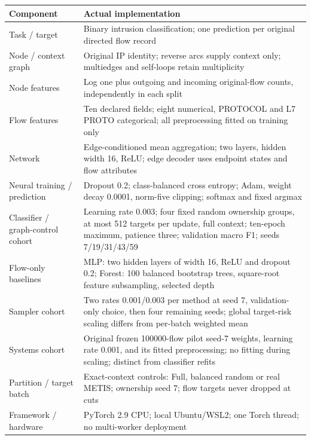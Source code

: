 \begin{tabular}{p{}p{}}
\toprule
Component & Actual implementation \\
\midrule
Task / target & Binary intrusion classification; one prediction per original directed flow record \\
Node / context graph & Original IP identity; reverse arcs supply context only; multiedges and self-loops retain multiplicity \\
Node features & Log one plus outgoing and incoming original-flow counts, independently in each split \\
Flow features & Ten declared fields; eight numerical, PROTOCOL and L7 PROTO categorical; all preprocessing fitted on training only \\
Network & Edge-conditioned mean aggregation; two layers, hidden width 16, ReLU; edge decoder uses endpoint states and flow attributes \\
Neural training / prediction & Dropout 0.2; class-balanced cross entropy; Adam, weight decay 0.0001, norm-five clipping; softmax and fixed argmax \\
Classifier / graph-control cohort & Learning rate 0.003; four fixed random ownership groups, at most 512 targets per update, full context; ten-epoch maximum, patience three; validation macro F1; seeds 7/19/31/43/59 \\
Flow-only baselines & MLP: two hidden layers of width 16, ReLU and dropout 0.2; Forest: 100 balanced bootstrap trees, square-root feature subsampling, selected depth \\
Sampler cohort & Two rates 0.001/0.003 per method at seed 7, validation-only choice, then four remaining seeds; global target-risk scaling differs from per-batch weighted mean \\
Systems cohort & Original frozen 100000-flow pilot seed-7 weights, learning rate 0.001, and its fitted preprocessing; no fitting during scaling; distinct from classifier refits \\
Partition / target batch & Exact-context controls: Full, balanced random or real METIS; ownership seed 7; flow targets never dropped at cuts \\
Framework / hardware & PyTorch 2.9 CPU; local Ubuntu/WSL2; one Torch thread; no multi-worker deployment \\
\bottomrule
\end{tabular}
